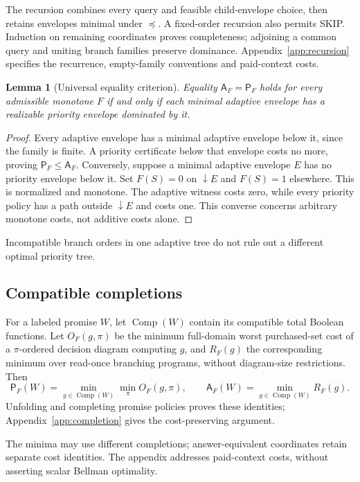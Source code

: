 \documentclass[pdflatex,sn-mathphys-num]{sn-jnl}
\newcommand{\A}{\mathsf{A}}
\newcommand{\Pcost}{\mathsf{P}}
\newcommand{\down}{\mathop{\downarrow}}
\newcommand{\Comp}{\operatorname{Comp}}
\theoremstyle{thmstyleone}
\newtheorem{lemma}[theorem]{Lemma}
\theoremstyle{thmstylethree}
\theoremstyle{thmstyletwo}
\begin{document}
The recursion combines every query and feasible child-envelope choice, then retains envelopes minimal under $\preceq$. A fixed-order recursion also permits SKIP. Induction on remaining coordinates proves completeness; adjoining a common query and uniting branch families preserve dominance. Appendix~\ref{app:recursion} specifies the recurrence, empty-family conventions and paid-context costs.

\begin{lemma}[Universal equality criterion]\label{lem:criterion}
Equality $\A_F=\Pcost_F$ holds for every admissible monotone $F$ if and only if each minimal adaptive envelope has a realizable priority envelope dominated by it.
\end{lemma}
\begin{proof}
Every adaptive envelope has a minimal adaptive envelope below it, since the family is finite. A priority certificate below that envelope costs no more, proving $\Pcost_F\leq\A_F$. Conversely, suppose a minimal adaptive envelope $E$ has no priority envelope below it. Set $F(S)=0$ on $\down E$ and $F(S)=1$ elsewhere. This is normalized and monotone. The adaptive witness costs zero, while every priority policy has a path outside $\down E$ and costs one. This converse concerns arbitrary monotone costs, not additive costs alone.
\end{proof}

Incompatible branch orders in one adaptive tree do not rule out a different optimal priority tree.

\subsection{Compatible completions}\label{sec:completion}
For a labeled promise $W$, let $\Comp(W)$ contain its compatible total Boolean functions. Let $O_F(g,\pi)$ be the minimum full-domain worst purchased-set cost of a $\pi$-ordered decision diagram computing $g$, and $R_F(g)$ the corresponding minimum over read-once branching programs, without diagram-size restrictions. Then
\[
 \Pcost_F(W)=\min_{g\in\Comp(W)}\min_\pi O_F(g,\pi),\qquad
 \A_F(W)=\min_{g\in\Comp(W)}R_F(g).
\]
Unfolding and completing promise policies proves these identities; Appendix~\ref{app:completion} gives the cost-preserving argument.

The minima may use different completions; answer-equivalent coordinates retain separate cost identities. The appendix addresses paid-context costs, without asserting scalar Bellman optimality.
\end{document}
